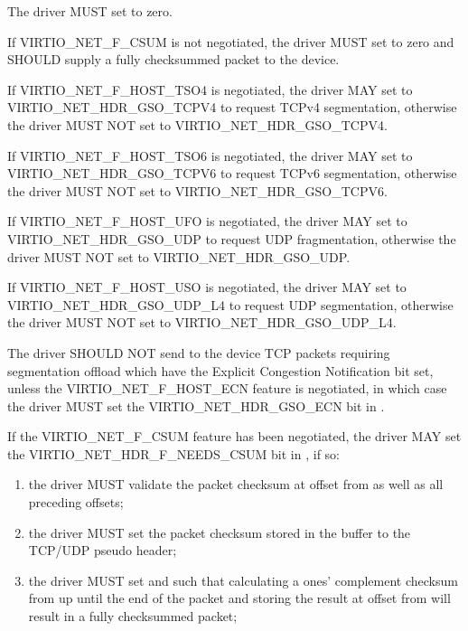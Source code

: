 
The driver MUST set  to zero.

If VIRTIO_NET_F_CSUM is not negotiated, the driver MUST set
 to zero and SHOULD supply a fully checksummed
packet to the device.

If VIRTIO_NET_F_HOST_TSO4 is negotiated, the driver MAY set
 to VIRTIO_NET_HDR_GSO_TCPV4 to request TCPv4
segmentation, otherwise the driver MUST NOT set
 to VIRTIO_NET_HDR_GSO_TCPV4.

If VIRTIO_NET_F_HOST_TSO6 is negotiated, the driver MAY set
 to VIRTIO_NET_HDR_GSO_TCPV6 to request TCPv6
segmentation, otherwise the driver MUST NOT set
 to VIRTIO_NET_HDR_GSO_TCPV6.

If VIRTIO_NET_F_HOST_UFO is negotiated, the driver MAY set
 to VIRTIO_NET_HDR_GSO_UDP to request UDP
fragmentation, otherwise the driver MUST NOT set
 to VIRTIO_NET_HDR_GSO_UDP.

If VIRTIO_NET_F_HOST_USO is negotiated, the driver MAY set
 to VIRTIO_NET_HDR_GSO_UDP_L4 to request UDP
segmentation, otherwise the driver MUST NOT set
 to VIRTIO_NET_HDR_GSO_UDP_L4.

The driver SHOULD NOT send to the device TCP packets requiring segmentation offload
which have the Explicit Congestion Notification bit set, unless the
VIRTIO_NET_F_HOST_ECN feature is negotiated, in which case the
driver MUST set the VIRTIO_NET_HDR_GSO_ECN bit in
.

If the VIRTIO_NET_F_CSUM feature has been negotiated, the
driver MAY set the VIRTIO_NET_HDR_F_NEEDS_CSUM bit in
, if so:
\begin{enumerate}
\item the driver MUST validate the packet checksum at
	offset  from  as well as all
	preceding offsets;
\item the driver MUST set the packet checksum stored in the
	buffer to the TCP/UDP pseudo header;
\item the driver MUST set  and
	 such that calculating a ones'
	complement checksum from  up until the end of
	the packet and storing the result at offset 
	from   will result in a fully checksummed
	packet;
\end{enumerate}

